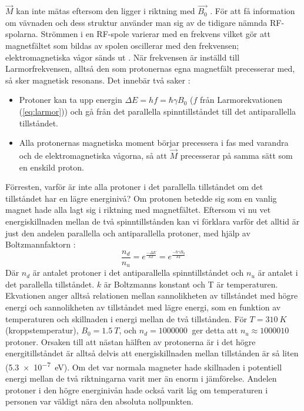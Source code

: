 \documentclass[11pt, a4paper]{article}
\begin{document}
$\vec{M}$ kan inte mätas eftersom den ligger i riktning med $\vec{B_0}$ \parencite{understanding_mri}. För att få information om vävnaden och dess struktur använder man sig av de tidigare nämnda RF-spolarna. Strömmen i en RF-spole varierar med en frekvens vilket gör att magnetfältet som bildas av spolen oscillerar med den frekvensen; elektromagnetiska vågor sänds ut \parencite{mri_for_radiologists}. När frekvensen är inställd till Larmorfrekvensen, alltså den som protonernas egna magnetfält precesserar med, så sker magnetisk resonans. Det innebär två saker \parencite{understanding_mri}:
\begin{itemize}
	\item Protoner kan ta upp energin $\Delta E=hf=\hbar\gamma B_0$ ($f$ från Larmorekvationen (\ref{eq:larmor})) och gå från det parallella spinntillståndet till det antiparallella tillståndet.
	\item Alla protonernas magnetiska moment börjar precessera i fas med varandra och de elektromagnetiska vågorna, så att $\vec{M}$ precesserar på samma sätt som en enskild proton.
\end{itemize}

Förresten, varför är inte alla protoner i det parallella tillståndet om det tillståndet har en lägre energinivå? Om protonen betedde sig som en vanlig magnet hade alla lagt sig i riktning med magnetfältet. Eftersom vi nu vet energiskillnaden mellan de två spinntillstånden kan vi förklara varför det alltid är just den andelen parallella och antiparallella protoner, med hjälp av Boltzmannfaktorn \parencite[s. 90]{mri_lärobok}:
\begin{equation}
	\frac{n_d}{n_u}=e^\frac{-\Delta E}{kT}=e^\frac{-\hbar\gamma B_0}{kT}
\end{equation}
Där $n_d$ är antalet protoner i det antiparallella spinntillståndet och $n_u$ är antalet i det parallella tillståndet. $k$ är Boltzmanns konstant och T är temperaturen. Ekvationen anger alltså relationen mellan sannolikheten av tillståndet med högre energi och sannolikheten av tillståndet med lägre energi, som en funktion av temperaturen och skillnaden i energi mellan de två tillstånden. För $T=\SI{310}{K}$ (kroppstemperatur), $B_0=\SI{1.5}{T}$, och $n_d=\SI{1000000}{}$ ger detta att $n_u\approx\SI{1000010}{}$ protoner. Orsaken till att nästan hälften av protonerna är i det högre energitillståndet är alltså delvis att energiskillnaden mellan tillstånden är så liten (\SI{5.3e-7}{eV}). Om det var normala magneter hade skillnaden i potentiell energi mellan de två riktningarna varit mer än enorm i jämförelse. Andelen protoner i den högre energinivån hade också varit låg om temperaturen i personen var väldigt nära den absoluta nollpunkten.
\end{document}
